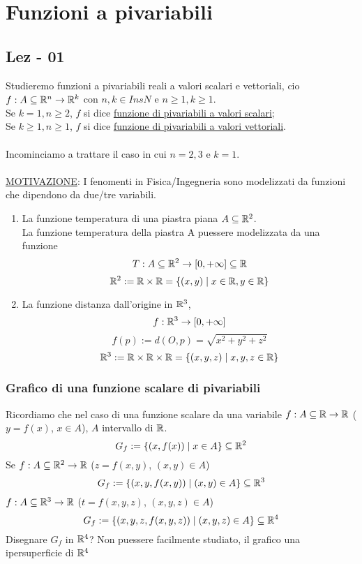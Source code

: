 \chapter{Funzioni a pi\acu variabili}
\section{Lez - 01}
Studieremo funzioni a pi\acu variabili reali a valori scalari e vettoriali, cio\ace 
$f : A \subseteq \mathbb{R}^n \to \mathbb{R}^k$ con $n, k \in Ins{N}$ e $n \geq 1, k \geq 1$. \\
Se $k = 1, n \geq 2$, $f$ si dice \underline{funzione di pi\acu variabili a valori scalari}; \\
Se $k \geq 1, n \geq 1$, $f$ si dice \underline{funzione di pi\acu variabili a valori vettoriali}.\\\\
Incominciamo a trattare il caso in cui $n = 2,3$ e $k = 1$.\\\\
\underline{MOTIVAZIONE}: I fenomenti in Fisica/Ingegneria sono modelizzati da funzioni che dipendono da due/tre variabili. 
\begin{example}
  \begin{enumerate}
    \item La funzione temperatura di una piastra piana $A \subseteq \mathbb{R}^2$. \\
          La funzione temperatura della piastra A pu\aco essere modelizzata da una funzione 
          $$T : A \subseteq \mathbb{R}^2 \to [0, +\infty] \subseteq \mathbb{R}$$
          $$\mathbb{R}^2 := \mathbb{R} \times \mathbb{R} = \{(x,y)\mid x \in \mathbb{R}, y \in \mathbb{R}\}$$
    \item La funzione distanza dall'origine in $\mathbb{R}^3$, $$f: \mathbb{R}^3 \to [0,+\infty]$$
          $$f(p) := d(O, p) = \sqrt{x^2+y^2+z^2}$$
          $$\mathbb{R}^3 := \mathbb{R} \times \mathbb{R} \times \mathbb{R}= \{(x,y,z)\mid x, y, z \in \mathbb{R}\}$$
  \end{enumerate}
\end{example} 
\subsection{Grafico di una funzione scalare di pi\acu variabili}
Ricordiamo che nel caso di una funzione scalare da una variabile $f: A \subseteq \mathbb{R} \to \mathbb{R}$ ($y = f(x)$, $x \in A$), 
$A$ intervallo di $\mathbb{R}$.
$$G_f := \{(x,f(x))\mid x \in A\} \subseteq \mathbb{R}^2$$
Se $f: A \subseteq \mathbb{R}^2 \to \mathbb{R}$ ($z = f(x,y)$, $(x,y) \in A$)
$$G_f := \{(x,y,f(x,y))\mid (x,y) \in A\} \subseteq \mathbb{R}^3$$
$f: A \subseteq \mathbb{R}^3 \to \mathbb{R}$ ($t = f(x,y,z)$, $(x,y,z) \in A$)
$$G_f := \{(x,y,z,f(x,y,z))\mid (x,y,z) \in A\} \subseteq \mathbb{R}^4$$
Disegnare $G_f$ in $\mathbb{R}^4$? Non pu\aco essere facilmente studiato, il grafico \ace una ipersuperficie di $\mathbb{R}^4$
